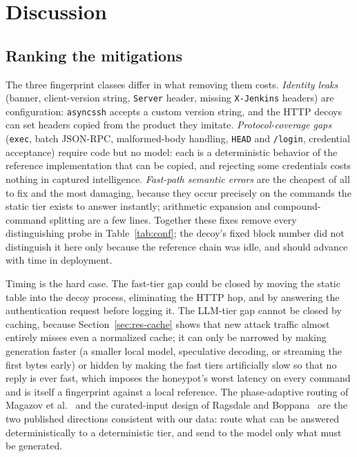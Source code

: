 \documentclass[conference]{IEEEtran}
\begin{document}
\section{Discussion}
\label{sec:discussion}
\subsection{Ranking the mitigations}
The three fingerprint classes differ in what removing them costs. \emph{Identity leaks} (banner, client-version string, \texttt{Server} header, missing \texttt{X-Jenkins} headers) are configuration: \texttt{asyncssh} accepts a custom version string, and the HTTP decoys can set headers copied from the product they imitate. \emph{Protocol-coverage gaps} (\texttt{exec}, batch JSON-RPC, malformed-body handling, \texttt{HEAD} and \texttt{/login}, credential acceptance) require code but no model: each is a deterministic behavior of the reference implementation that can be copied, and rejecting some credentials costs nothing in captured intelligence. \emph{Fast-path semantic errors} are the cheapest of all to fix and the most damaging, because they occur precisely on the commands the static tier exists to answer instantly; arithmetic expansion and compound-command splitting are a few lines. Together these fixes remove every distinguishing probe in Table~\ref{tab:conf}; the decoy's fixed block number did not distinguish it here only because the reference chain was idle, and should advance with time in deployment.

Timing is the hard case. The fast-tier gap could be closed by moving the static table into the decoy process, eliminating the HTTP hop, and by answering the authentication request before logging it. The LLM-tier gap cannot be closed by caching, because Section~\ref{sec:res-cache} shows that new attack traffic almost entirely misses even a normalized cache; it can only be narrowed by making generation faster (a smaller local model, speculative decoding, or streaming the first bytes early) or hidden by making the fast tiers artificially slow so that no reply is ever fast, which imposes the honeypot's worst latency on every command and is itself a fingerprint against a local reference. The phase-adaptive routing of Magazov et al.~\cite{ref11} and the curated-input design of Ragsdale and Boppana~\cite{ref6} are the two published directions consistent with our data: route what can be answered deterministically to a deterministic tier, and send to the model only what must be generated.
\end{document}
